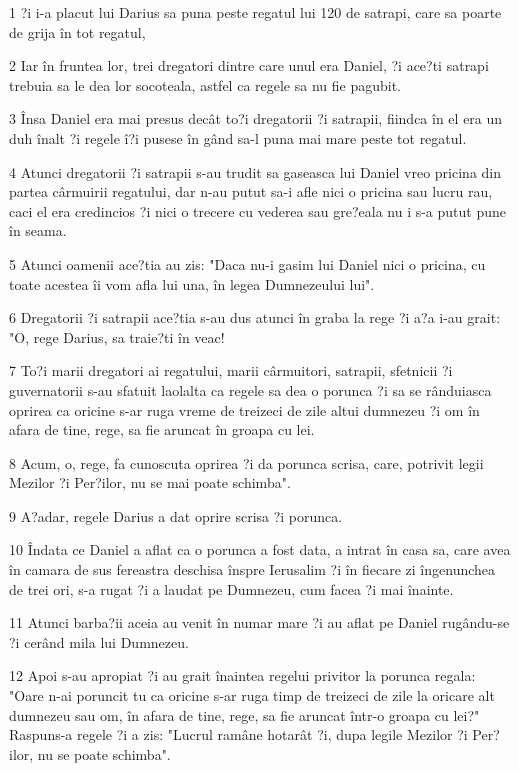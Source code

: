 \par 1 ?i i-a placut lui Darius sa puna peste regatul lui 120 de satrapi, care sa poarte de grija în tot regatul,
\par 2 Iar în fruntea lor, trei dregatori dintre care unul era Daniel, ?i ace?ti satrapi trebuia sa le dea lor socoteala, astfel ca regele sa nu fie pagubit.
\par 3 Însa Daniel era mai presus decât to?i dregatorii ?i satrapii, fiindca în el era un duh înalt ?i regele î?i pusese în gând sa-l puna mai mare peste tot regatul.
\par 4 Atunci dregatorii ?i satrapii s-au trudit sa gaseasca lui Daniel vreo pricina din partea cârmuirii regatului, dar n-au putut sa-i afle nici o pricina sau lucru rau, caci el era credincios ?i nici o trecere cu vederea sau gre?eala nu i s-a putut pune în seama.
\par 5 Atunci oamenii ace?tia au zis: "Daca nu-i gasim lui Daniel nici o pricina, cu toate acestea îi vom afla lui una, în legea Dumnezeului lui".
\par 6 Dregatorii ?i satrapii ace?tia s-au dus atunci în graba la rege ?i a?a i-au grait: "O, rege Darius, sa traie?ti în veac!
\par 7 To?i marii dregatori ai regatului, marii cârmuitori, satrapii, sfetnicii ?i guvernatorii s-au sfatuit laolalta ca regele sa dea o porunca ?i sa se rânduiasca oprirea ca oricine s-ar ruga vreme de treizeci de zile altui dumnezeu ?i om în afara de tine, rege, sa fie aruncat în groapa cu lei.
\par 8 Acum, o, rege, fa cunoscuta oprirea ?i da porunca scrisa, care, potrivit legii Mezilor ?i Per?ilor, nu se mai poate schimba".
\par 9 A?adar, regele Darius a dat oprire scrisa ?i porunca.
\par 10 Îndata ce Daniel a aflat ca o porunca a fost data, a intrat în casa sa, care avea în camara de sus fereastra deschisa înspre Ierusalim ?i în fiecare zi îngenunchea de trei ori, s-a rugat ?i a laudat pe Dumnezeu, cum facea ?i mai înainte.
\par 11 Atunci barba?ii aceia au venit în numar mare ?i au aflat pe Daniel rugându-se ?i cerând mila lui Dumnezeu.
\par 12 Apoi s-au apropiat ?i au grait înaintea regelui privitor la porunca regala: "Oare n-ai poruncit tu ca oricine s-ar ruga timp de treizeci de zile la oricare alt dumnezeu sau om, în afara de tine, rege, sa fie aruncat într-o groapa cu lei?" Raspuns-a regele ?i a zis: "Lucrul ramâne hotarât ?i, dupa legile Mezilor ?i Per?ilor, nu se poate schimba".
